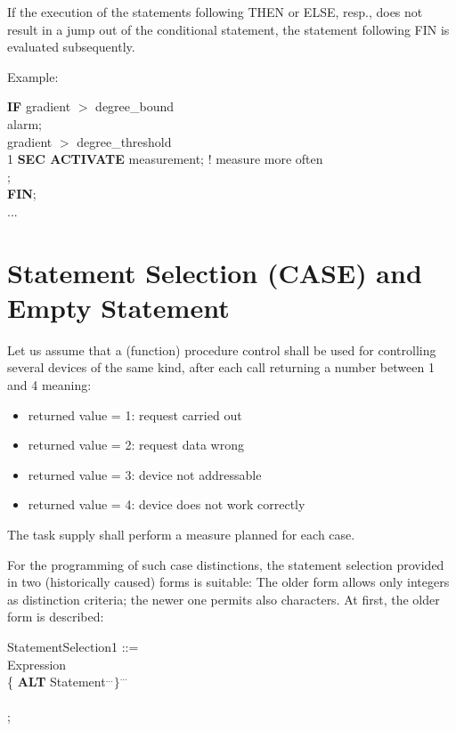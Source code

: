If the execution of the statements following THEN or ELSE, resp., does
not result in a jump out of the conditional statement, the statement
following FIN is evaluated subsequently.

Example:

{\bf IF} gradient $>$ degree\_bound \\
 alarm;\\
 gradient $>$ degree\_threshold \\
\x \x {} 1 {\bf SEC ACTIVATE} measurement; ! measure more often\\
\x {};\\
{\bf FIN};\\
...

\section{Statement Selection (CASE) and Empty Statement}  %

Let us assume that a (function) procedure control shall be used for
controlling several devices of the same kind, after each call returning
a number between 1 and 4 meaning:
\begin{itemize}
\item returned value = 1: request carried out
\item returned value = 2: request data wrong
\item returned value = 3: device not addressable
\item returned value = 4: device does not work correctly
\end{itemize}

The task supply shall perform a measure planned for each case.

For the programming of such case distinctions, the statement selection
provided in two (historically caused) forms is suitable: The older form
allows only integers as distinction criteria; the newer one permits also
characters. At first, the older form is described:

\begin{front}
StatementSelection1 ::=\\
 Expression\\
\x \x \{ {\bf ALT} Statement$^{...} \}^{...}$\\
\x {}\\
;
\end{front}
\begin{grammar}


\end{grammar}

